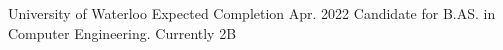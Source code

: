 

\begin{cventries}

  \cventry
    {University of Waterloo} %
    {} %
    {} %
    {Expected Completion Apr. 2022} %
    {Candidate for B.AS. in Computer Engineering. Currently 2B}

\end{cventries}
